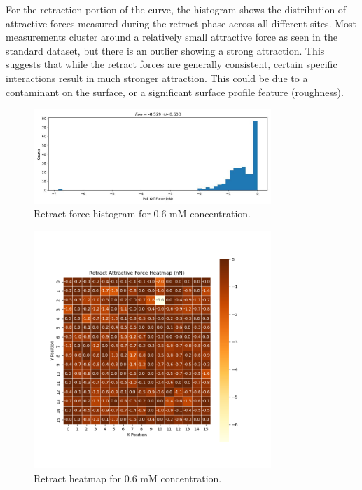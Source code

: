 For the retraction portion of the curve, the histogram shows the distribution of attractive forces measured during the retract phase across all different sites. Most measurements cluster around a relatively small attractive force as seen in the standard dataset, but there is an outlier showing a strong attraction. This suggests that while the retract forces are generally consistent, certain specific interactions result in much stronger attraction. This could be due to a contaminant on the surface, or a significant surface profile feature (roughness).

\begin{figure}[h!!!]
    \centering
    \includegraphics[width=0.8\textwidth]{chapter7/ForceMaps/0.5mM/retract_f_a_hist.jpg}
    \caption{Retract force histogram for 0.6 mM concentration.}
    \label{fig:retract_f_a_hist_0.5mM}
\end{figure}

\begin{figure}[h!!!]
    \centering
    \includegraphics[width=0.8\textwidth]{chapter7/ForceMaps/0.5mM/Retract heatmap.png}
    \caption{Retract heatmap for 0.6 mM concentration.}
    \label{fig:retract_heatmap_0.5mM}
\end{figure}

